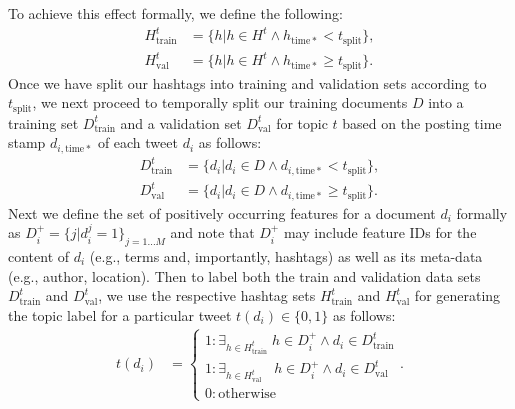 \begin{enumerate}
To achieve this effect formally, we define the following:
\begin{align*}
H^t_\mathrm{train} & = \{ h | h \in H^t \land h_\mathrm{time*} <    t_\mathrm{split} \} ,  \\
H^t_\mathrm{val}   & = \{ h | h \in H^t \land h_\mathrm{time*} \geq t_\mathrm{split} \} .
\end{align*}
Once we have split our hashtags into training and validation sets
according to $t_\mathrm{split}$, we next proceed to temporally split
our training documents $D$ into a training set $D^t_\mathrm{train}$ and a validation set
$D^t_\mathrm{val}$ for topic $t$ based on the posting
time stamp $d_{i,\mathrm{time*}}$ of each tweet $d_i$ as follows: 
\begin{align*}
D^t_\mathrm{train} & = \{ d_i | d_i \in D \land d_{i,\mathrm{time*}} <    t_\mathrm{split} \} ,  \\
D^t_\mathrm{val}   & = \{ d_i | d_i \in D \land d_{i,\mathrm{time*}} \geq t_\mathrm{split} \} .
\end{align*}
Next we define the set of positively occurring features for a document
$d_i$ formally as $D_i^+ = \{ j | d_i^j=1 \}_{j=1\ldots M}$ and note that
$D_i^+$ may include feature IDs for the content of $d_i$ (e.g., terms and, importantly, 
hashtags) as well as its meta-data (e.g., author, location).
Then to label both the train and validation data sets $D^t_\mathrm{train}$ and $D^t_\mathrm{val}$, 
we use the respective
hashtag sets $H^t_\mathrm{train}$ and $H^t_\mathrm{val}$ for generating
the topic label for a particular tweet $t(d_{i}) \in \{0,1\}$ as follows:
\begin{align*}
t(d_{i}) & =
  \begin{cases}
    1: \exists_{h \in H^t_\mathrm{train}} \; h \in D_i^+ \land d_{i} \in D^t_\mathrm{train} \\
    1: \exists_{h \in H^t_\mathrm{val}}   \;\;\; h \in D_i^+ \land d_{i} \in D^t_\mathrm{val}   \\
    0: \mathrm{otherwise}
  \end{cases} .
\end{align*}


\end{enumerate}
